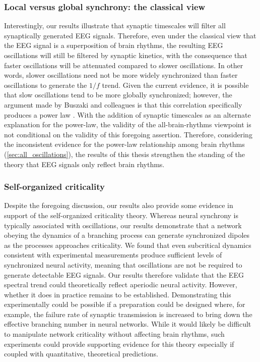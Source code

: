 \subsubsection{Local versus global synchrony: the classical view}
Interestingly, our results illustrate that synaptic timescales will filter all synaptically generated EEG signals. Therefore, even under the classical view that the EEG signal is a superposition of brain rhythms, the resulting EEG oscillations will still be filtered by synaptic kinetics, with the consequence that faster oscillations will be attenuated compared to slower oscillations. In other words, slower oscillations need not be more widely synchronized than faster oscillations to generate the $1/f$ trend. Given the current evidence, it is possible that slow oscillations tend to be more globally synchronized; however, the argument made by Buszaki and colleagues is that this correlation specifically produces a power law \cite{Buzsaki2006,Penttonen2003}. With the addition of synaptic timescales as an alternate explanation for the power-law, the validity of the all-brain-rhythms viewpoint is not conditional on the validity of this foregoing assertion. Therefore, considering the inconsistent evidence for the power-law relationship among brain rhythms (\autoref{sec:all_oscillations}), the results of this thesis strengthen the standing of the theory that EEG signals only reflect brain rhythms. 

\subsubsection{Self-organized criticality}
Despite the foregoing discussion, our results also provide some evidence in support of the self-organized criticality theory. Whereas neural synchrony is typically associated with oscillations, our results demonstrate that a network obeying the dynamics of a branching process can generate synchronized dipoles as the processes approaches criticality. We found that even subcritical dynamics consistent with experimental measurements \cite{Wilting2018,Wilting2019,Suryadi2022} produce sufficient levels of synchronized neural activity, meaning that oscillations are not be required to generate detectable EEG signals. Our results therefore validate that the EEG spectral trend could theoretically reflect aperiodic neural activity. However, whether it does in practice remains to be established. Demonstrating this experimentally could be possible if a preparation could be designed where, for example, the failure rate of synaptic transmission is increased to bring down the effective branching number in neural networks. While it would likely be difficult to manipulate network criticality without affecting brain rhythms, such experiments could provide supporting evidence for this theory especially if coupled with quantitative, theoretical predictions.

